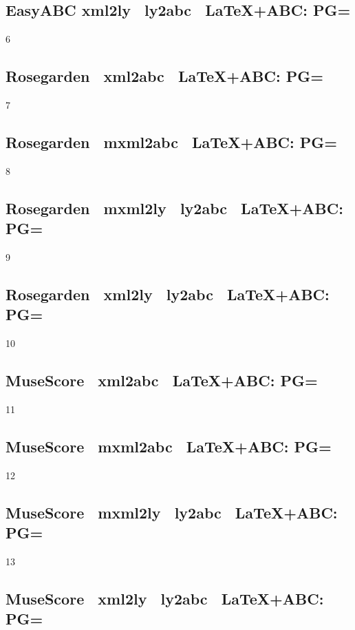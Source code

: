 \subsection{Easy\-ABC \ra xml2ly \ra\ ly2abc \ra\ \LaTeX+ABC: PG=}

6

\subsection{Rose\-garden \ra\ xml2abc \ra\ \LaTeX+ABC: PG=} 

7

\subsection{Rose\-garden \ra\ mxml2abc \ra\ \LaTeX+ABC: PG=} 

8

\subsection{Rose\-garden \ra\ mxml2ly \ra\ ly2abc \ra\ \LaTeX+ABC: PG=} 

9

\subsection{Rose\-garden \ra\ xml2ly \ra\ ly2abc \ra\ \LaTeX+ABC: PG=} 

10

\subsection{Muse\-Score \ra\ xml2abc \ra\ \LaTeX+ABC: PG=} 

11

\subsection{Muse\-Score \ra\ mxml2abc \ra\ \LaTeX+ABC: PG=}

12

\subsection{Muse\-Score \ra\ mxml2ly \ra\ ly2abc \ra\ \LaTeX+ABC: PG=} 

13

\subsection{Muse\-Score \ra\ xml2ly \ra\ ly2abc \ra\ \LaTeX+ABC: PG=}


